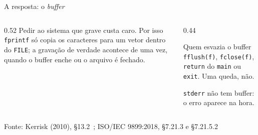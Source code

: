 \documentclass[aspectratio=169]{beamer}
\newcommand{\fonte}[1]{\vfill\hfill{\scriptsize\textcolor{UFSGray}{Fonte: #1}}}
\begin{document}
\begin{frame}[fragile]{A resposta: o \emph{buffer}}
  \begin{center}
  \end{center}
  \vspace{-0.4em}
  \begin{columns}[T]
    \begin{column}{0.52\textwidth}
      \small Pedir ao sistema que grave custa caro. Por isso \texttt{fprintf}
      só copia os caracteres para um vetor dentro do \texttt{FILE}; a
      gravação de verdade acontece de uma vez, quando o buffer enche ou o
      arquivo é fechado.
    \end{column}
    \begin{column}{0.44\textwidth}
      \begin{block}{Quem esvazia o buffer}
        \small \texttt{fflush(f)}, \texttt{fclose(f)}, \texttt{return} do
        \texttt{main} ou \texttt{exit}. Uma queda, não.
      \end{block}
      \small \texttt{stderr} não tem buffer: o erro aparece na hora.
    \end{column}
  \end{columns}
  \fonte{Kerrisk (2010), §13.2~\cite{kerrisk2010linux};
    ISO/IEC 9899:2018, §7.21.3 e §7.21.5.2~\cite{iso2018c17}}
\end{frame}
\end{document}
